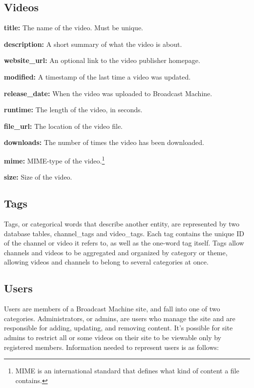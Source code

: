 \documentclass[a4paper,12pt]{report}
\begin{document}
\subsection*{Videos}
\begin{description}
\item{\textbf{title: } The name of the video. Must be unique.}
\item{\textbf{description: } A short summary of what the video is about.}
\item{\textbf{website\_url: } An optional link to the video publisher homepage.}
\item{\textbf{modified: } A timestamp of the last time a video was updated.}
\item{\textbf{release\_date: } When the video was uploaded to Broadcast Machine.}
\item{\textbf{runtime: } The length of the video, in seconds.}
\item{\textbf{file\_url: } The location of the video file.}
\item{\textbf{downloads: } The number of times the video has been downloaded.}
\item{\textbf{mime: } MIME-type of the video.\footnote{MIME is an international standard that defines what kind of content a file contains.}}
\item{\textbf{size: } Size of the video.} \\
\end{description}

\subsection*{Tags}
Tags, or categorical words that describe another entity, are represented by two database tables, channel\_tags and video\_tags. Each tag contains the unique ID of the channel or video it refers to, as well as the one-word tag itself. Tags allow channels and videos to be aggregated and organized by category or theme, allowing videos and channels to belong to several categories at once.

\subsection*{Users}
Users are members of a Broadcast Machine site, and fall into one of two categories. Administrators, or admins, are users who manage the site and are responsible for adding, updating, and removing content. It's possible for site admins to restrict all or some videos on their site to be viewable only by registered members. Information needed to represent users is as follows:
\end{document}
